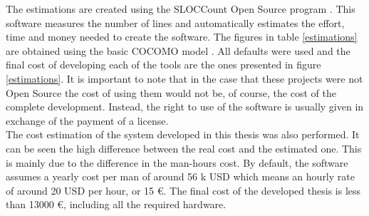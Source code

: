 \begin{appendices}
\begin{table}[H]
\end{table}


		The estimations are created using the SLOCCount Open Source program \cite{sloccount}. 
		This software measures the number of lines and automatically estimates the effort, time and money needed to create the software. 
		The figures in table \ref{estimations} are obtained using the basic COCOMO model \cite{Boehm}. 
		All defaults were used and the final cost of developing each of the tools are the ones presented in figure \ref{estimations}. 
		It is important to note that in the case that these projects were not Open Source the cost of using them would not be, of course, the cost of the complete development. 
		Instead, the right to use of the software is usually given in exchange of the payment of a license. 
		\\

		The cost estimation of the system developed in this thesis was also performed. 
		It can be seen the high difference between the real cost and the estimated one. 
		This is mainly due to the difference in the man-hours cost. 
		By default, the software assumes a yearly cost per man of around 56 k USD which means an hourly rate of around 20 USD per hour, or 15 \euro. 
		The final cost of the developed thesis is less than 13000 \euro, including all the required hardware. 

\end{appendices}
